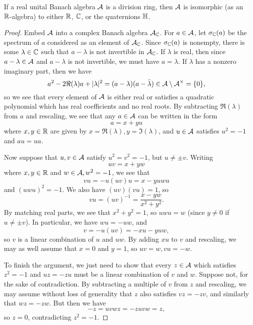 \begin{cor} If a real unital Banach algebra $\mathcal{A}$ is a division ring, then $\mathcal{A}$ is isomorphic (as an $\mathbb{R}$-algebra) to either $\mathbb{R}$, $\mathbb{C}$, or the quaternions $\mathbb{H}$.
\end{cor}
\begin{proof} Embed $\mathcal{A}$ into a complex Banach algebra $\mathcal{A}_{\mathbb{C}}$. For $a \in \mathcal{A}$, let $\sigma_{\mathbb{C}}(a)$ be the spectrum of $a$ considered as an element of $\mathcal{A}_{\mathbb{C}}$. Since $\sigma_{\mathbb{C}}(a)$ is nonempty, there is some $\lambda \in \mathbb{C}$ such that $a - \lambda$ is not invertible in $\mathcal{A}_{\mathbb{C}}$. If $\lambda$ is real, then since $a - \lambda \in \mathcal{A}$ and $a - \lambda$ is not invertible, we must have $a = \lambda$. If $\lambda$ has a nonzero imaginary part, then we have
\[
a^2 - 2\Re(\lambda)a + |\lambda|^2 = (a-\lambda)(a - \bar{\lambda}) \in \mathcal{A} \setminus \mathcal{A}^\times = \{0\},
\]
so we see that every element of $\mathcal{A}$ is either real or satisfies a quadratic polynomial which has real coefficients and no real roots. By subtracting $\Re(\lambda)$ from $a$ and rescaling, we see that any $a \in \mathcal{A}$ can be written in the form
\[
a = x + yu
\]
where $x,y \in \mathbb{R}$ are given by $x = \Re(\lambda), y = \Im(\lambda)$, and $u \in \mathcal{A}$ satisfies $u^2 = -1$ and $au = ua$.

Now suppose that $u,v \in \mathcal{A}$ satisfy $u^2 = v^2 = -1$, but $u \ne \pm v$. Writing
\[
uv = x + yw
\]
where $x,y \in \mathbb{R}$ and $w \in \mathcal{A}, w^2 = -1$, we see that
\[
vu = -u(uv)u = x - yuwu
\]
and $(uwu)^2 = -1$. We also have $(uv)(vu) = 1$, so
\[
vu = (uv)^{-1} = \frac{x - yw}{x^2 + y^2}.
\]
By matching real parts, we see that $x^2 + y^2 = 1$, so $uwu = w$ (since $y \ne 0$ if $u \ne \pm v$). In particular, we have $wu = -uw$, and
\[
v = -u(uv) = -xu - yuw,
\]
so $v$ is a linear combination of $u$ and $uw$. By adding $xu$ to $v$ and rescaling, we may as well assume that $x = 0$ and $y = 1$, so $uv = w, vu = -w$.

To finish the argument, we just need to show that every $z \in \mathcal{A}$ which satisfies $z^2 = -1$ and $uz = -zu$ must be a linear combination of $v$ and $w$. Suppose not, for the sake of contradiction. By subtracting a multiple of $v$ from $z$ and rescaling, we may assume without loss of generality that $z$ also satisfies $vz = -zv$, and similarly that $wz = -zw$. But then we have
\[
-z = uvwz = -zuvw = z,
\]
so $z = 0$, contradicting $z^2 = -1$.
\end{proof}

